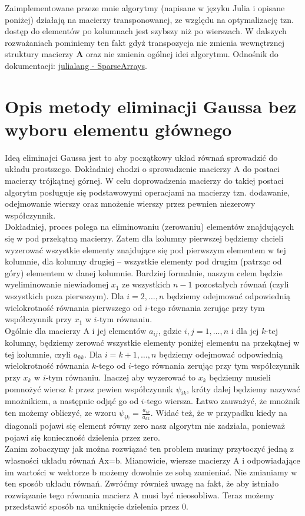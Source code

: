 \documentclass[]{article}
\newcommand{\mA}{\bm{A}}
\begin{document}
	\noindent Zaimplementowane przeze mnie algorytmy (napisane w języku Julia i opisane poniżej) działają na macierzy transponowanej, ze względu na optymalizację tzn. dostęp do elementów po kolumnach jest szybszy niż po wierszach. W dalszych rozważaniach pominiemy ten fakt gdyż transpozycja nie zmienia wewnętrznej struktury macierzy $\mA$ oraz nie zmienia ogólnej idei algorytmu.
	Odnośnik do dokumentacji: 
	\href{https://docs.julialang.org/en/v1/stdlib/SparseArrays/}{julialang - SparseArrays}.
	

	\section*{Opis metody eliminacji Gaussa bez wyboru elementu głównego}
	Ideą eliminajci Gaussa jest to aby początkowy układ równań sprowadzić do układu prostszego. Dokładniej chodzi o sprowadzenie macierzy A do postaci macierzy trójkątnej górnej. W celu doprowadzenia macierzy do takiej postaci algorytm posługuje się podstawowymi operacjami na macierzy tzn. dodawanie, odejmowanie wierszy oraz mnożenie wierszy przez pewnien niezerowy współczynnik. \\
	Dokładniej, proces polega na eliminowaniu (zerowaniu) elementów znajdujących się w pod przekątną macierzy.
	Zatem dla kolumny pierwszej będziemy chcieli wyzerować wszystkie elementy znajdujące się pod pierwszym elementem w tej kolumnie, dla kolumny drugiej -- wszystkie elementy pod drugim (patrząc od góry) elementem w danej kolumnie. Bardziej formalnie, naszym celem będzie wyeliminowanie niewiadomej $x_1$ ze wszystkich $n-1$ pozostałych równań (czyli wszystkich poza pierwszym). Dla $i = 2,\ldots,n$ będziemy odejmować odpowiednią wielokrotność równania pierwszego od $i$-tego równania zerując przy tym współczynnik przy $x_1$ w $i$-tym równaniu. \\
	Ogólnie dla macierzy A i jej elementów $a_{ij}$, gdzie $i,j = 1,\ldots,n$ i dla jej $k$-tej kolumny, będziemy zerować wszystkie elementy poniżej elementu na przekątnej w tej kolumnie, czyli $a_{kk}$. Dla $i = k+1,\ldots,n$ będziemy odejmować odpowiednią wielokrotność równania $k$-tego od $i$-tego równania zerując przy tym współczynnik przy $x_k$ w $i$-tym równaniu. Inaczej aby wyzerować to $x_k$ będziemy musieli pomnożyć wiersz $k$ przez pewien współczynnik $\psi_{ik}$, króty dalej będziemy nazywać mnożnikiem, a następnie odjąć go od $i$-tego wiersza. Łatwo zauważyć, że mnożnik ten możemy obliczyć, ze wzoru $\psi_{ik}$ = $\frac{a_{ik}}{a_{kk}}$. Widać też, że w przypadku kiedy na diagonali pojawi się element równy zero nasz algorytm nie zadziała, ponieważ pojawi się konieczność dzielenia przez zero. \\
	Zanim zobaczymy jak można rozwiązać ten problem musimy przytoczyć jedną z własności układu równań Ax=b. Mianowicie, wiersze macierzy A i odpowiadające im wartości w wektorze b możemy dowolnie ze sobą zamieniać. Nie zmianiamy w ten sposób układu równań.
	Zwróćmy również uwagę na fakt, że aby istniało rozwiązanie tego równania macierz A musi być nieosobliwa. 
	Teraz możemy przedstawić sposób na uniknięcie dzielenia przez 0. 
\end{document}
